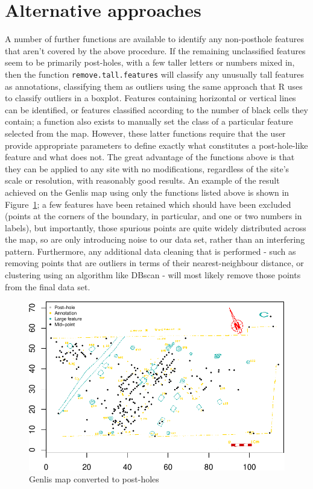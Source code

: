 \documentclass[10pt,fleqn]{article}
\begin{document}
\section{Alternative approaches}
A number of further functions are available to identify any non-posthole features that aren't covered by the above procedure. If the remaining unclassified features seem to be primarily post-holes, with a few taller letters or numbers mixed in, then the function \texttt{remove.tall.features} will classify any unusually tall features as annotations, classifying them as outliers using the same approach that R uses to classify outliers in a boxplot. Features containing horizontal or vertical lines can be identified, or features classified according to the number of black cells they contain; a function also exists to manually set the class of a particular feature selected from the map. However, these latter functions require that the user provide appropriate parameters to define exactly what constitutes a post-hole-like feature and what does not. The great advantage of the functions above is that they can be applied to any site with no modifications, regardless of the site's scale or resolution, with reasonably good results. An example of the result achieved on the Genlis map using only the functions listed above is shown in Figure~\ref{fig:Genlis-result}; a few features have been retained which should have been excluded (points at the corners of the boundary, in particular, and one or two numbers in labels), but importantly, those spurious points are quite widely distributed across the map, so are only introducing noise to our data set, rather than an interfering pattern. Furthermore, any additional data cleaning that is performed - such as removing points that are outliers in terms of their nearest-neighbour distance, or clustering using an algorithm like DBscan - will most likely remove those points from the final data set.

\begin{figure}[h!]
\caption{Genlis map converted to post-holes}
\label{fig:Genlis-result}
\centering
\includegraphics[scale=1]{genlis-features.pdf}
\end{figure}
\end{document}
